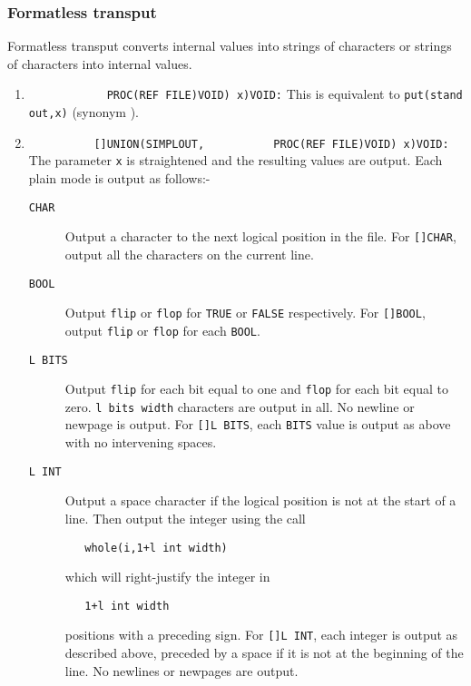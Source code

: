 \subsubsection*{Formatless transput}
Formatless transput converts internal values into strings of
characters or strings of characters into internal values.
\begin{enumerate}
\item {}\newline
\verb|            PROC(REF FILE)VOID) x)VOID:|\newline
This is equivalent to \verb|put(stand out,x)| (synonym ).
\item {}\newline
\verb|          []UNION(SIMPLOUT,|\newline
\verb|          PROC(REF FILE)VOID) x)VOID:|\newline
The parameter \verb|x| is straightened and the resulting values are
output. Each plain mode is output as follows:-
\begin{description}
\item[\texttt{CHAR}] Output a character to the next logical position in the
file. For \verb|[]CHAR|, output all the characters on the current
line.
\item[\texttt{BOOL}] Output \verb|flip| or \verb|flop| for \verb|TRUE| or
\verb|FALSE| respectively. For \verb|[]BOOL|, output \verb|flip| or
\verb|flop| for each \verb|BOOL|.
\item[\texttt{L BITS}] Output \verb|flip| for each bit equal to one and
\verb|flop| for each bit equal to zero. \verb|l bits width|
characters are output in all. No newline or newpage is output. For
\verb|[]L BITS|, each \verb|BITS| value is output as above with no
intervening spaces.
\item[\texttt{L INT}] Output a space character if the logical position is not
at the start of a line. Then output the integer using the call
\begin{verbatim}
   whole(i,1+l int width)
\end{verbatim}
\noindent
which will right-justify the integer in
\begin{verbatim}
   1+l int width
\end{verbatim}
\noindent
positions with a preceding sign. For \verb|[]L INT|, each integer is
output as described above, preceded by a space if it is not at the
beginning of the line. No newlines or newpages are output.

\end{description}
\end{enumerate}
